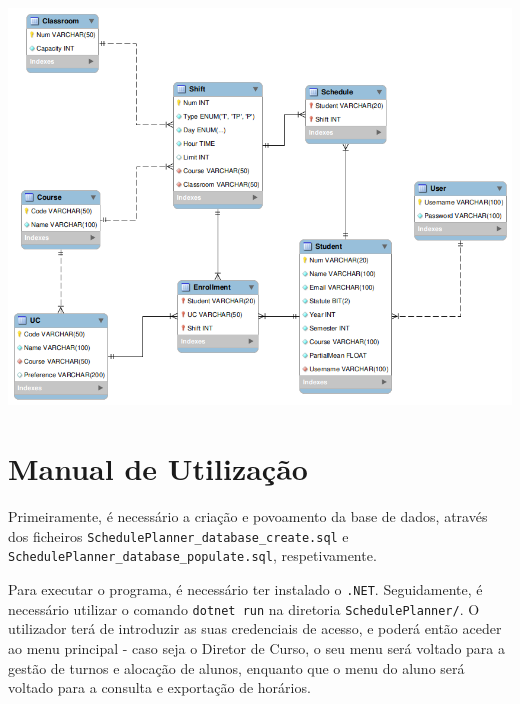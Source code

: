 \documentclass[a4paper,12pt]{scrreprt}
\begin{document}
\begin{minipage}{\textwidth}
    \centering
    \includegraphics[width=1\textwidth]{images/SchedulePlanner_db.png}
    \label{fig:9-1-base_de_dados_do_sistema}
\end{minipage}




\chapter{Manual de Utilização}

Primeiramente, é necessário a criação e povoamento da base de dados, através dos ficheiros \texttt{SchedulePlanner\_database\_create.sql}
e \texttt{SchedulePlanner\_database\_populate.sql}, respetivamente.

Para executar o programa, é necessário ter instalado o \texttt{.NET}.
Seguidamente, é necessário utilizar o comando \texttt{dotnet run} na diretoria \texttt{SchedulePlanner/}.
O utilizador terá de introduzir as suas credenciais de acesso, e poderá então aceder ao menu principal - caso seja o Diretor de Curso,
o seu menu será voltado para a gestão de turnos e alocação de alunos, enquanto que o menu do aluno será voltado para a consulta e exportação
de horários.
\end{document}
